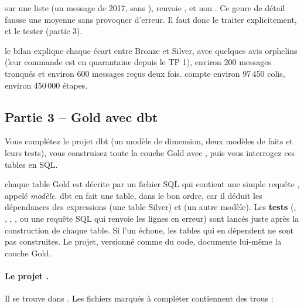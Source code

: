 \begin{attention}
sur une liste  (un message de 2017, sans ),  renvoie ,
et non . Ce genre de détail fausse une moyenne sans provoquer d'erreur. Il faut donc le traiter
explicitement, et le tester (partie 3).
\end{attention}

\begin{resultat}
le bilan explique chaque écart entre Bronze et Silver, avec quelques avis orphelins (leur commande est
en quarantaine depuis le TP 1), environ 200 messages tronqués et environ 600 messages reçus deux
fois.  compte environ 97\,450 colis,  environ
450\,000 étapes.
\end{resultat}


\subsection*{Partie 3 -- Gold avec dbt \hfill {}}

Vous complétez le projet dbt (un modèle de dimension, deux modèles de faits et leurs tests), vous
construisez toute la couche Gold avec , puis vous interrogez ces tables en SQL.

\begin{notion}
chaque table Gold est décrite par un fichier SQL qui contient
une simple requête , appelé \emph{modèle}. dbt en fait une table, dans le bon ordre, car il
déduit les dépendances des expressions  (une table Silver) et
 (un autre modèle). Les \textbf{tests} (, ,
, , ou une requête SQL qui renvoie les lignes en erreur)
sont lancés juste après la construction de chaque table. Si l'un échoue, les tables qui en
dépendent ne sont pas construites. Le projet, versionné comme du code, documente lui-même la couche
Gold.
\end{notion}

\paragraph{Le projet .} Il se trouve dans .
Les fichiers marqués \og à compléter \fg{} contiennent des trous :


